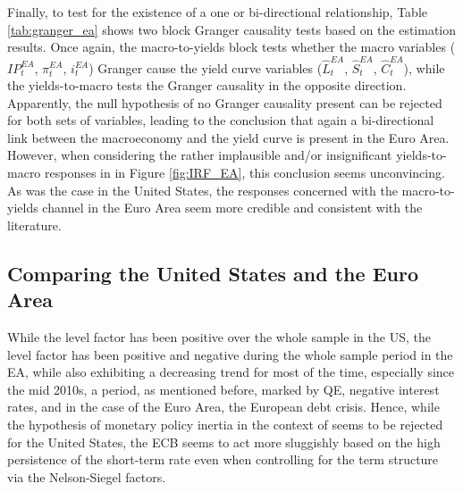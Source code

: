 Finally, to test for the existence of a one or bi-directional relationship, Table \ref{tab:granger_ea} shows two block Granger causality tests based on the estimation results. 
Once again, the macro-to-yields block tests whether the macro variables ($IP^{EA}_{t}$, $\pi^{EA}_{t}$, $i^{EA}_{t}$) Granger cause the yield curve variables ($\hat{L}^{EA}_{t}$, $\hat{S}^{EA}_{t}$, $\hat{C}^{EA}_{t}$), while the yields-to-macro tests the Granger causality in the opposite direction. 
Apparently, the null hypothesis of no Granger causality present can be rejected for both sets of variables,
leading to the conclusion that again a bi-directional link between the macroeconomy and the yield curve is present in the Euro Area. 
However, when considering the rather implausible and/or insignificant yields-to-macro responses in in Figure \ref{fig:IRF_EA}, this conclusion seems unconvincing. 
As was the case in the United States, the responses concerned with the macro-to-yields channel in the Euro Area seem more credible and consistent with the literature. 

\subsection{Comparing the United States and the Euro Area}
\label{sec:comparison}
While the level factor has been positive over the whole sample in the US, the level factor has been positive and negative during the whole sample period in the EA, while also exhibiting a decreasing trend for most of the time, especially since the mid 2010s, a period, as mentioned before, marked by QE, negative interest rates, and in the case of the Euro Area, the European debt crisis. 
Hence, while the hypothesis of monetary policy inertia in the context of \citet{rudebusch2005monetary} seems to be rejected for the United States, the ECB seems to act more sluggishly based on the high persistence of the short-term rate even when controlling for the term structure via the Nelson-Siegel factors. 









